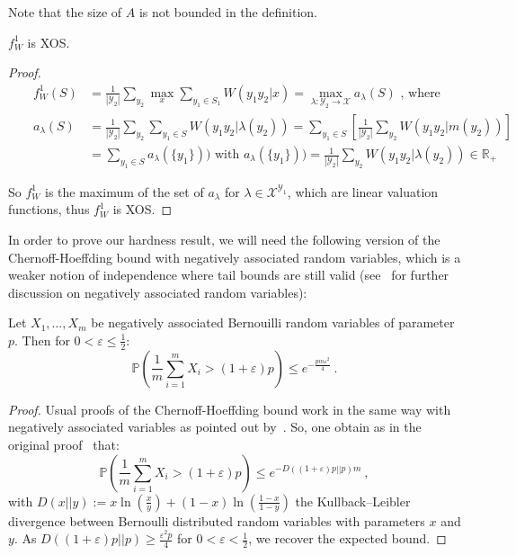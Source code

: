 \begin{rk}
  Note that the size of $A$ is not bounded in the definition. 
\end{rk}

\begin{proposition}
  $f_W^1$ is \textrm{XOS}.
\end{proposition}
\begin{proof}
  \begin{equation}
    \begin{aligned}
      &&f_W^1(S) &= \frac{1}{|\mathcal{Y}_2|}\sum_{y_2} \max_x \sum_{y_1 \in S_1} W(y_1y_2|x) = \max_{\lambda : \mathcal{Y}_2 \rightarrow \mathcal{X}} a_{\lambda}(S) \text{ , where}\\
      &&a_{\lambda}(S) &= \frac{1}{|\mathcal{Y}_2|}\sum_{y_2}  \sum_{y_1 \in S} W(y_1y_2|\lambda(y_2)) = \sum_{y_1 \in S} \left[\frac{1}{|\mathcal{Y}_2|}\sum_{y_2}  W(y_1y_2|m(y_2))\right]\\
      &&&= \sum_{y_1 \in S} a_{\lambda}(\{ y_1 \})) \text{ with } a_{\lambda}(\{ y_1 \})) = \frac{1}{|\mathcal{Y}_2|}\sum_{y_2}  W(y_1y_2|\lambda(y_2)) \in \mathbb{R}_+
      \end{aligned}
  \end{equation}

  So $f_W^1$ is the maximum of the set of $a_{\lambda}$ for $\lambda \in \mathcal{X}^{\mathcal{Y}_1}$, which are linear valuation functions, thus $f_W^1$ is \textrm{XOS}.
\end{proof}

In order to prove our hardness result, we will need the following version of the Chernoff-Hoeffding bound with negatively associated random variables, which is a weaker notion of independence where tail bounds are still valid (see~\cite{DR98} for further discussion on negatively associated random variables):
\begin{proposition}
  \label{prop:chernoff}
  Let $X_1, \ldots, X_m$ be negatively associated Bernouilli random variables of parameter $p$. Then for $0 < \varepsilon \leq \frac{1}{2}$:
  \[ \mathbb{P}\left(\frac{1}{m}\sum_{i=1}^m X_i > (1+\varepsilon)p \right) \leq e^{-\frac{pm\varepsilon^2}{4}} \ . \]
\end{proposition}
\begin{proof}
  Usual proofs of the Chernoff-Hoeffding bound work in the same way with negatively associated variables as pointed out by~\cite{DR98}. So, one obtain as in the original proof~\cite{Hoeffding63} that:
  \[ \mathbb{P}\left(\frac{1}{m}\sum_{i=1}^m X_i > (1+\varepsilon)p \right) \leq e^{-D\left((1+\varepsilon)p||p\right)m} \ ,\]
    with $D\left(x||y\right) := x\ln\left(\frac{x}{y}\right) + (1-x)\ln\left(\frac{1-x}{1-y}\right)$ the Kullback–Leibler divergence between Bernoulli distributed random variables with parameters $x$ and $y$. As $D\left((1+\varepsilon)p||p\right) \geq \frac{\varepsilon^2p}{4}$ for $0 < \varepsilon < \frac{1}{2}$, we recover the expected bound.
\end{proof}

